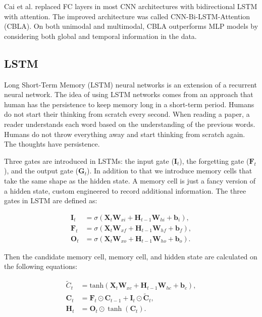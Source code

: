 Cai et al. \cite{Cai2019} replaced FC layers in most CNN architectures with
bidirectional LSTM with attention. The improved architecture was called
CNN-Bi-LSTM-Attention (CBLA). On both unimodal and multimodal, CBLA outperforms
MLP models by considering both global and temporal information in the data.

\subsection{LSTM}
Long Short-Term Memory (LSTM) neural networks is an extension of a recurrent
neural network. The idea of using LSTM networks comes from an approach that
human has the persistence to keep memory long in a short-term period. Humans do
not start their thinking from scratch every second. When reading a paper, a
reader understands each word based on the understanding of the previous words.
Humans do not throw everything away and start thinking from scratch again. The
thoughts have persistence.

Three gates are introduced in LSTMs: the input gate ($\mathbf{I}_t$), the
forgetting gate ($\mathbf{F}_t$), and the output gate ($\mathbf{G}_t$). In
addition to that we introduce memory cells that take the same shape as the
hidden state.  A memory cell is just a fancy version of a hidden state, custom
engineered to record additional information. The three gates in LSTM are
defined as:

\begin{align}
\mathbf{I}_t &= \sigma(\mathbf{X}_t \mathbf{W}_{xi} + \mathbf{H}_{t-1} \mathbf{W}_{hi} + \mathbf{b}_i),\\
\mathbf{F}_t &= \sigma(\mathbf{X}_t \mathbf{W}_{xf} + \mathbf{H}_{t-1} \mathbf{W}_{hf} + \mathbf{b}_f),\\
\mathbf{O}_t &= \sigma(\mathbf{X}_t \mathbf{W}_{xo} + \mathbf{H}_{t-1} \mathbf{W}_{ho} + \mathbf{b}_o).
\end{align}

Then the candidate memory cell, memory cell, and hidden state are calculated on
the following equations:

\begin{align}
\widetilde{C}_t &= \text{tanh}(\mathbf{X}_t \mathbf{W}_{xc} + \mathbf{H}_{t-1} \mathbf{W}_{hc} + \mathbf{b}_c), \\
\mathbf{C}_t &= \mathbf{F}_t \odot \mathbf{C}_{t-1} + \mathbf{I}_t \odot \tilde{\mathbf{C}}_t, \\
\mathbf{H}_t &= \mathbf{O}_t \odot \tanh(\mathbf{C}_t).
\end{align}

